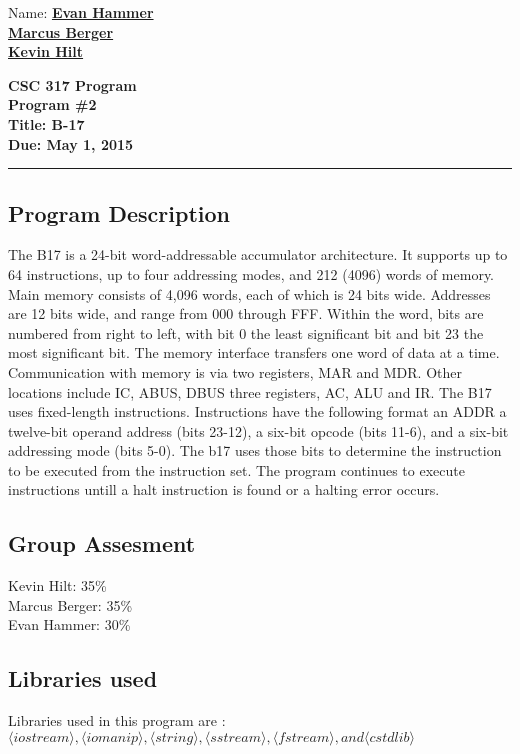 \documentclass[11pt]{article}
\newcommand{\HWKtitle}[4]{\begin{center}
\textbf{#1\\Program #2\\Title: #3\\Due: #4}
\end{center}\medskip\hrule\bigskip}
\newcommand{\HWKname}[3]{\begin{flushright}
Name: \underline{\textbf{#1}}\\ \underline{\textbf{#2}}\\ \underline{\textbf{#3}}\end{flushright}}
\begin{document}
\HWKname{Evan Hammer}{Marcus Berger}{Kevin Hilt}  %

\HWKtitle{CSC 317 Program}{\#2}{B-17}{May 1, 2015}

\subsection{Program Description}
The B17 is a 24-bit word-addressable accumulator architecture.  It supports up to 64 instructions, up to four addressing modes, and 212 (4096) words of memory. Main memory consists of 4,096 words, each of which is 24 bits wide. Addresses are 12 bits wide, and range from 000 through FFF. Within the word, bits are numbered from right to left, with bit 0 the least significant bit and bit 23 the most significant bit. The memory interface transfers one word of data at a time. Communication with memory is via two registers, MAR and MDR. Other locations include IC, ABUS, DBUS three registers, AC, ALU and IR. The B17 uses fixed-length instructions. Instructions have the following format an ADDR a twelve-bit operand address (bits 23-12), a six-bit opcode (bits 11-6), and a six-bit addressing mode (bits 5-0). The b17 uses those bits to determine the instruction to be executed from the instruction set. The program continues to execute instructions untill a halt instruction is found or a halting error occurs.

\subsection{Group Assesment}
Kevin Hilt: 35\%\\
Marcus Berger: 35\%\\
Evan Hammer: 30\%\\

\subsection{Libraries used}
Libraries used in this program are :\\
$\langle iostream \rangle, \langle iomanip \rangle, \langle string \rangle, \langle sstream \rangle, \langle fstream \rangle, and \langle cstdlib \rangle$
\end{document}
